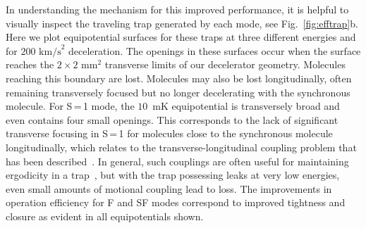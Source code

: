 \documentclass[%
 reprint,
 amsmath,amssymb,
 aps,
prl,
]{revtex4-1}
\begin{document}
In understanding the mechanism for this improved performance, it is helpful to visually inspect the traveling trap generated by each mode, see Fig.~\ref{fig:efftrap}b.
Here we plot equipotential surfaces for these traps at three different energies and for $200 \text{ km/s}^2$ deceleration.
The openings in these surfaces occur when the surface reaches the $2 \times 2\text{ mm}^2$ transverse limits of our decelerator geometry. Molecules reaching this boundary are lost.
Molecules may also be lost longitudinally, often remaining transversely focused but no longer decelerating with the synchronous molecule.
For S\,=\,1 mode, the $10$~mK equipotential is transversely broad and even contains four small openings.
This corresponds to the lack of significant transverse focusing in S\,=\,1 for molecules close to the synchronous molecule longitudinally, which relates to the transverse-longitudinal coupling problem that has been described~\cite{VanDeMeerakker2006}.
In general, such couplings are often useful for maintaining ergodicity in a trap~\cite{Surkov1996}, but with the trap possessing leaks at very low energies, even small amounts of motional coupling lead to loss. 
The improvements in operation efficiency for F and SF modes correspond to improved tightness and closure as evident in all equipotentials shown.
\end{document}
